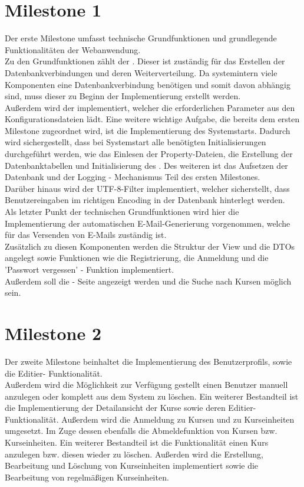 \section{Milestone 1}

Der erste Milestone umfasst technische Grundfunktionen und grundlegende Funktionalitäten der Webanwendung.\\
Zu den Grundfunktionen zählt der . Dieser ist zuständig für das Erstellen der Datenbankverbindungen und deren Weiterverteilung. Da systemintern viele Komponenten eine Datenbankverbindung benötigen und somit davon abhängig sind, muss dieser zu Beginn der Implementierung erstellt werden.\\
Außerdem wird der  implementiert, welcher die erforderlichen Parameter aus den Konfigurationsdateien lädt.
Eine weitere wichtige Aufgabe, die bereits dem ersten Milestone zugeordnet wird, ist die
Implementierung des Systemstarts. Dadurch wird sichergestellt, dass bei Systemstart alle
benötigten Initialisierungen durchgeführt werden, wie das Einlesen der Property-Dateien, die Erstellung der Datenbanktabellen und Initialisierung des .
Des weiteren ist das Aufsetzen der Datenbank und der Logging - Mechanismus Teil des ersten Milestones.\\
Darüber hinaus wird der  UTF-8-Filter implementiert, welcher sicherstellt, dass Benutzereingaben
im richtigen Encoding in der Datenbank hinterlegt werden.\\
Als letzter Punkt der technischen Grundfunktionen wird hier die Implementierung der automatischen E-Mail-Generierung vorgenommen, welche für das Versenden von E-Mails zuständig ist.\\ 
Zusätzlich zu diesen Komponenten werden die Struktur der View  und die DTOs angelegt sowie Funktionen wie die Registrierung, die Anmeldung und die 'Passwort vergessen' - Funktion implementiert.\\
Außerdem soll die  - Seite angezeigt werden und die Suche nach Kursen möglich sein.\\

\section{Milestone 2}

Der zweite Milestone beinhaltet die Implementierung des Benutzerprofils, sowie die Editier-
Funktionalität.\\
Außerdem wird die Möglichkeit zur Verfügung gestellt einen Benutzer manuell anzulegen oder komplett aus dem System zu löschen.
Ein weiterer Bestandteil ist die Implementierung der Detailansicht der Kurse sowie deren Editier-Funktionalität.
Außerdem wird die Anmeldung zu Kursen und zu Kurseinheiten umgesetzt. Im Zuge dessen ebenfalls die Abmeldefunktion von Kursen bzw. Kurseinheiten.
Ein weiterer Bestandteil ist die Funktionalität einen Kurs anzulegen bzw. diesen wieder zu löschen. 
Außerden wird die Erstellung, Bearbeitung und Löschung von Kurseinheiten implementiert sowie die Bearbeitung von regelmäßigen Kurseinheiten.


